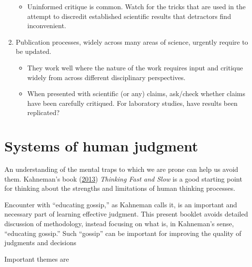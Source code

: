 \documentclass[
  10pt,
  b5paper]{book}
\providecommand{\tightlist}{%
  \setlength{\itemsep}{0pt}\setlength{\parskip}{0pt}}
\begin{document}
\begin{enumerate}
  \begin{itemize}
  \tightlist
  \item
    Uninformed critique is common. Watch for the
    tricks that are used in the attempt to discredit established
    scientific results that detractors find inconvenient.
  \end{itemize}
\item
  Publication processes, widely across many areas of science,
  urgently require to be updated.

  \begin{itemize}
  \tightlist
  \item
    They work well where the nature of the work requires input
    and critique widely from across different disciplinary
    perspectives.
  \item
    When presented with scientific (or any) claims, ask/check
    whether claims have been carefully critiqued. For laboratory
    studies, have results been replicated?
  \end{itemize}
\end{enumerate}

\mainmatter

\hypertarget{systems-of-human-judgment}{%
\chapter{Systems of human judgment}\label{systems-of-human-judgment}}

An understanding of the mental traps to which we are prone
can help us avoid them. Kahneman's book (\protect\hyperlink{ref-kahneman_2013}{2013})
\emph{Thinking Fast and Slow} is a good starting point for
thinking about the strengths and limitations of human
thinking processes.

Encounter with ``educating gossip,'' as Kahneman calls it, is an
important and necessary part of learning effective judgment.
This present booklet avoids detailed discussion of methodology,
instead focusing on what is, in Kahneman's sense, ``educating
gossip.'' Such ``gossip'' can be important for improving the quality
of judgments and decisions

Important themes are
\end{document}
